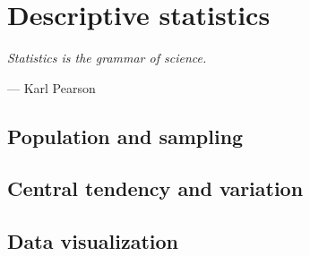 \chapter{Descriptive statistics}
\label{chapter1}

\epigraph{\textit{Statistics is the grammar of science.}}{— Karl Pearson}

\section{Population and sampling}

\section{Central tendency and variation}

\section{Data visualization}
